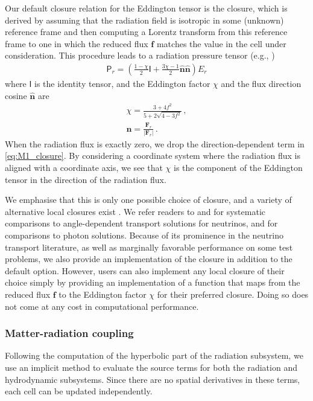 \documentclass[fleqn,usenatbib]{mnras}
\begin{document}
Our default closure relation for the Eddington tensor is the \cite{Levermore_1984} closure, which is derived by assuming that the radiation field is isotropic in some (unknown) reference frame and then computing a Lorentz transform from this reference frame to one in which the reduced flux $\mathbf{f}$ matches the value in the cell under consideration. This procedure leads to a radiation pressure tensor (e.g., \citealt{Gonzalez_2007,Rosdahl_2013,Skinner_2013})
\begin{align}
\label{eq:M1_closure}
\mathsf{P}_r = \left( \frac{1 - \chi}{2} \mathsf{I} + \frac{3\chi - 1}{2} \mathbf{\hat n} \mathbf{\hat n} \right) E_r
\end{align}
where $\mathsf{I}$ is the identity tensor, and the Eddington factor $\chi$ and the flux direction cosine $\mathbf{\hat n}$ are
\begin{align}
\chi = \frac{3 + 4f^2}{5 + 2 \sqrt{4 - 3 f^2}} \, , \\
\mathbf{\hat n} = \frac{\mathbf{F}_r}{|\mathbf{F}_r|} \, .
\end{align}
When the radiation flux is exactly zero, we drop the direction-dependent term in \autoref{eq:M1_closure}. By considering a coordinate system where the radiation flux is aligned with a coordinate axis, we see that $\chi$ is the component of the Eddington tensor in the direction of the radiation flux.

We emphasise that this is only one possible choice of closure, and a variety of alternative local closures exist \citep[e.g.,][]{Minerbo_1978,Levermore_1981}. We refer readers to \citet{Janka_1992} and \citet{Koerner_1992} for systematic comparisons to angle-dependent transport solutions for neutrinos, and \citet{Olson_2000} for comparisons to photon solutions. Because of its prominence in the neutrino transport literature, as well as marginally favorable performance on some test problems, we also provide an implementation of the \cite{Minerbo_1978} closure in addition to the default \citet{Levermore_1984} option. However, users can also implement any local closure of their choice simply by providing an implementation of a function that maps from the reduced flux $\mathbf{f}$ to the Eddington factor $\chi$ for their preferred closure. Doing so does not come at any cost in computational performance.

\subsubsection{Matter-radiation coupling}
\label{sssec:coupling}
Following the computation of the hyperbolic part of the radiation subsystem, we use an implicit method to evaluate the source terms for both the radiation and hydrodynamic subsystems. Since there are no spatial derivatives in these terms, each cell can be updated independently.
\end{document}

